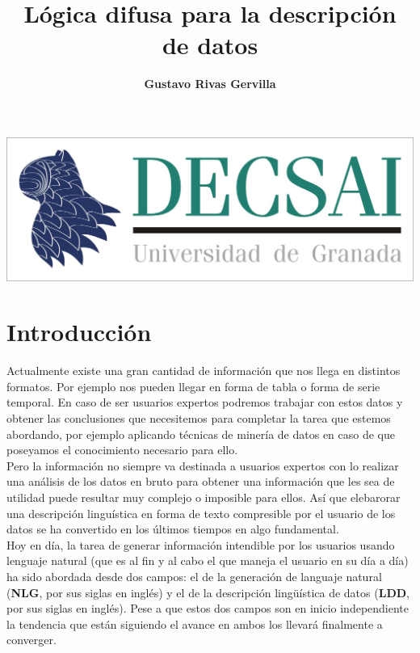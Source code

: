 \documentclass[10pt,a4paper]{article}
\author{\textbf{Gustavo Rivas Gervilla}}
\title{\textcolor{deepblue}{\textbf{Lógica difusa para la descripción de datos}}}
\date{}
\begin{document}
\maketitle
\begin{center}
\includegraphics[scale=0.5]{img/decsai}
\end{center}

\newpage

\tableofcontents

\newpage
{} %
\section{Introducción}

Actualmente existe una gran cantidad de información que nos llega en distintos formatos. Por ejemplo nos pueden llegar en forma de tabla o forma de serie temporal. En caso de ser usuarios expertos podremos trabajar con estos datos y obtener las conclusiones que necesitemos para completar la tarea que estemos abordando, por ejemplo aplicando técnicas de minería de datos en caso de que poseyamos el conocimiento necesario para ello.\\

Pero la información no siempre va destinada a usuarios expertos con lo realizar una análisis de los datos en bruto para obtener una información que les sea de utilidad puede resultar muy complejo o imposible para ellos. Así que elebarorar una descripción linguística en forma de texto compresible por el usuario de los datos se ha convertido en los últimos tiempos en algo fundamental.\\

Hoy en día, la tarea de generar información intendible por los usuarios usando lenguaje natural (que es al fin y al cabo el que maneja el usuario en su día a día) ha sido abordada desde dos campos: el de la generación de languaje natural (\textbf{NLG}, por sus siglas en inglés) y el de la descripción lingüística de datos (\textbf{LDD}, por sus siglas en inglés). Pese a que estos dos campos son en inicio independiente la tendencia que están siguiendo el avance en ambos los llevará finalmente a converger.\\
\end{document}
